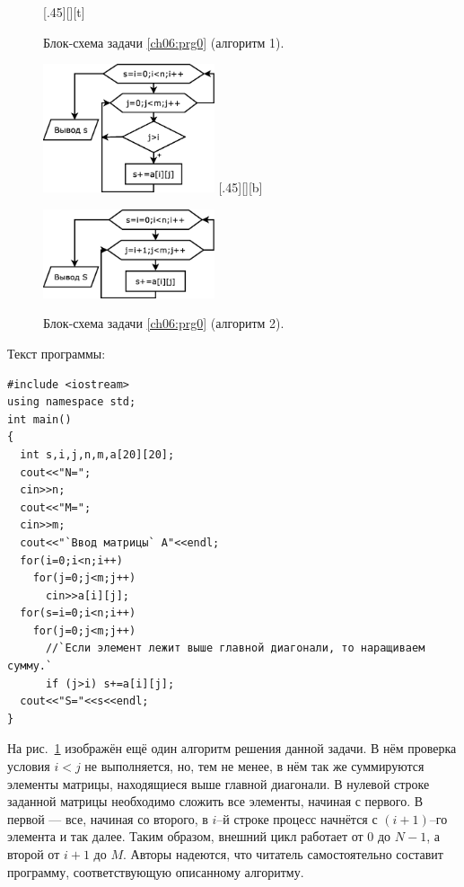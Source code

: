 \begin{figure}[H]
\begin{floatrow}
[.45\textwidth][\FBheight][t]
{\caption{Блок-схема задачи \ref{ch06:prg0} (алгоритм 1).}
\label{ch06:refDrawing6}}
{\includegraphics[width=0.45\textwidth,keepaspectratio]{img/ris_6_7}}\hspace*{0.05\textwidth}
%
[.45\textwidth][\FBheight][b]
{\caption{Блок-схема задачи \ref{ch06:prg0} (алгоритм 2).}
\label{ch06:refDrawing7}}
{\includegraphics[width=0.45\textwidth,keepaspectratio]{img/ris_6_8}}
\end{floatrow}
\end{figure}



Текст программы: 
\begin{lstlisting}
#include <iostream>
using namespace std;
int main()
{
  int s,i,j,n,m,a[20][20]; 
  cout<<"N=";
  cin>>n;
  cout<<"M=";
  cin>>m;
  cout<<"`Ввод матрицы` A"<<endl;
  for(i=0;i<n;i++)
    for(j=0;j<m;j++)
      cin>>a[i][j];
  for(s=i=0;i<n;i++)
    for(j=0;j<m;j++)
      //`Если элемент лежит выше главной диагонали, то наращиваем сумму.` 
      if (j>i) s+=a[i][j];
  cout<<"S="<<s<<endl;
}
\end{lstlisting}

На рис.~\ref{ch06:refDrawing7} изображён ещё один алгоритм решения данной задачи. 
В нём проверка условия  $i<j$ не выполняется, но, тем не менее, в нём так же 
суммируются элементы матрицы, находящиеся выше главной диагонали. В
нулевой строке заданной матрицы необходимо сложить все элементы, начиная с первого. В первой --- все, начиная со
второго, в $i$–й строке процесс начнётся с $(i+1)$–го элемента и так далее. Таким образом, внешний цикл работает от 0 до
$N-1$, а второй от $i+1$ до $M$. Авторы надеются, что читатель самостоятельно составит программу, соответствующую
описанному алгоритму.



